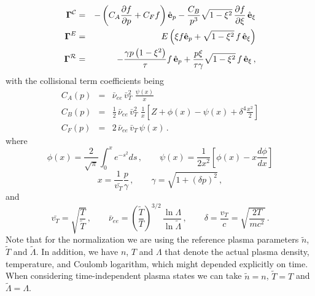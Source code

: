 \documentclass[preprint,11pt]{elsarticle}
\newcommand{\bq}{\begin{equation}}
\newcommand{\eq}{\end{equation}}
\begin{document}
%
\begin{eqnarray}
\label{eq:collisionflux}
{\bf \Gamma}^{\cal C}&=& -\left ( C_A \frac{\partial f}{\partial p} + C_F f \right) \hat {\bf e}_p-
\frac{C_B}{p^3} \sqrt{1-\xi^2} \, \frac{\partial f}{\partial \xi}\, \hat {\bf e}_\xi \\
\label{eq:electricfieldflux}
{\bf \Gamma}^{E}&=& E \left(\xi f  \hat {\bf e}_p + \sqrt{1-\xi^2}  \, f\, \hat {\bf e}_\xi \right) \\
\label{eq:radiationflux}
{\bf \Gamma}^{\cal R}&=& -\frac{\gamma p \left(1-\xi^2\right)}{\tau} f \, \hat {\bf e}_p +
\frac{p \xi}{\tau \gamma} \sqrt{1-\xi^2}\, f\, \hat {\bf e}_\xi \, ,
\end{eqnarray}
%
with the collisional term coefficients being 
%
\begin{eqnarray}
C_A (p) &=& \bar{\nu}_{ee} \, \bar{v}_T^2 \,\,\frac{\psi(x)}{x}
 \\
C_B (p)&=& \frac{1}{2} \,\bar{\nu}_{ee} 
\, \bar{v}_T^2 \, \, \frac{1}{x}  \left[ Z + \phi(x)- \psi(x) + \delta^4  \frac{x^2}{2} \right]\\
C_F (p)&=&2\,\bar{\nu}_{ee}  \, \bar{v}_T \, \psi(x) \, .
\end{eqnarray}
%
where
%
\bq
\phi(x)=\frac{2}{\sqrt{\pi}} \int_0^x e^{-s^2} ds \, ,\qquad
\psi(x)=\frac{1}{2 x^2} \left[ \phi(x)-x \frac{d \phi}{dx} \right] 
\eq
%
\bq
x=\frac{1}{\bar{v_T}} \frac{p}{\gamma}\, , \qquad
\gamma=\sqrt{1+\left(\delta p\right)^2} \, ,
\eq
and
\bq
\bar{v_T}=\sqrt{\frac{T}{\tilde{T}}}\, , \qquad \bar{\nu}_{ee}=\left(\frac{\tilde{T}}{T}\right)^{3/2}\, \frac{\ln \Lambda}{\ln \tilde{\Lambda}} \, , \qquad  \delta=\frac{v_T}{c}=\sqrt{\frac{2 T}{m c^2}} \, .
\eq
%
Note that for the normalization we are using the reference plasma parameters $\tilde{n}$, $\tilde{T}$ and 
$\tilde{\Lambda}$. In addition, we have $n$, $T$ and $\Lambda$ that denote the actual plasma density, temperature,  and Coulomb logarithm, which might depended explicitly on time. When considering time-independent plasma states we can take $\tilde{n}=n$, $\tilde{T}=T$ and 
$\tilde{\Lambda}=\Lambda$. 
\end{document}
